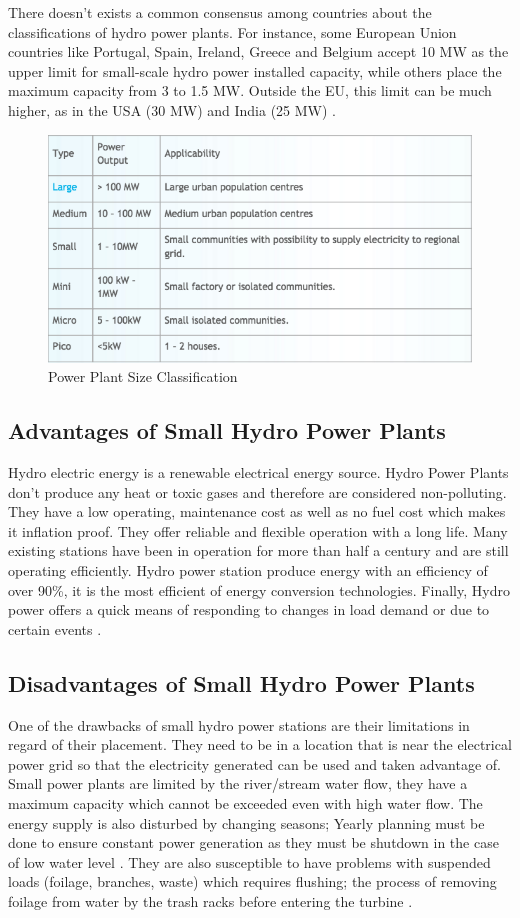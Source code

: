 There doesn't exists a common consensus among countries about the classifications of hydro power plants. For instance, some European Union countries like Portugal, Spain, Ireland, Greece and Belgium accept 10 MW as the upper limit for small-scale hydro power installed capacity, while others place the maximum capacity from 3 to 1.5 MW. Outside the EU, this limit can be much higher, as in the USA (30 MW) and India (25 MW) \cite{HydroPP}.
\begin{figure}[H]
\centering
\includegraphics[scale=0.7]{Images/PP_Classification.png}
\caption[Power Plant Size Classification]{Power Plant Size Classification \cite{HydroPower}}
\end{figure} 
\subsection{Advantages of Small Hydro Power Plants}
Hydro electric energy is a renewable electrical energy source. Hydro Power Plants don't produce any heat or toxic gases and therefore are considered non-polluting. They have a low operating, maintenance cost as well as no fuel cost which makes it inflation proof. They offer reliable and flexible operation with a long life. Many existing stations have been in operation for more than half a century and are still operating efficiently. Hydro power station produce energy with an efficiency of over 90\%, it is the most efficient of energy conversion technologies. Finally, Hydro power offers a quick means of responding to changes in load demand or due to certain events \cite{SmallScale}.
\subsection{Disadvantages of Small Hydro Power Plants}
One of the drawbacks of small hydro power stations are their limitations in regard of their placement. They need to be in a location that is near the electrical power grid so that the electricity generated can be used and taken advantage of. Small power plants are limited by the river/stream water flow, they have a maximum capacity which cannot be exceeded even with high water flow. The energy supply is also disturbed by changing seasons; Yearly planning must be done to ensure constant power generation as they must be shutdown in the case of low water level \cite{HydroPP,SEIT2017}. They are also susceptible to have problems with suspended loads (foilage, branches, waste) which requires flushing; the process of removing foilage from water by the trash racks before entering the turbine \cite{SEIT2017}.
